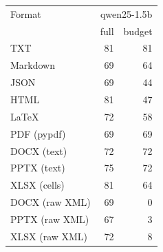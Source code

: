 \begin{tabular}{lrr}
\toprule
Format & \multicolumn{2}{c}{qwen25-1.5b} \\
 & full & budget \\
\midrule
TXT & 81 & 81 \\
Markdown & 69 & 64 \\
JSON & 69 & 44 \\
HTML & 81 & 47 \\
LaTeX & 72 & 58 \\
PDF (pypdf) & 69 & 69 \\
DOCX (text) & 72 & 72 \\
PPTX (text) & 75 & 72 \\
XLSX (cells) & 81 & 64 \\
DOCX (raw XML) & 69 & 0 \\
PPTX (raw XML) & 67 & 3 \\
XLSX (raw XML) & 72 & 8 \\
\bottomrule
\end{tabular}
